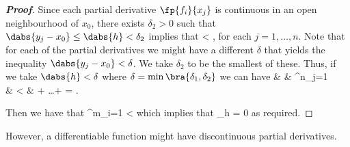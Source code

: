 \begin{proof}[\bf Proof]
Since each partial derivative $\fp{f_i}{x_j}$ is continuous in an open neighbourhood of $x_0$, there exists $\delta_2>0$ such that $\dabs{y_j - x_0} \leq \dabs{h} <\delta_2$ implies that
\be
{} < ,
\ee
for each $j=1,\dots,n$. Note that for each of the partial derivatives we might have a different $\delta$ that yields the inequality $\dabs{y_j - x_0} <\delta$. We take $\delta_2$ to be the smallest of these. Thus, if we take $\dabs{h}<\delta$ where $\delta = \min\bra{\delta_1,\delta_2}$ we can have
\beast
{} & \leq & \sum^n_{j=1} \cdot {} \\
& < &  + \dots +  = .
\eeast

Then we have that
\be
{} \leq \sum^m_{i=1}  < \ve
\ee
which implies that
\be
\lim_{h} = 0
\ee
as required.
\end{proof}

However, a differentiable function might have discontinuous partial derivatives.

